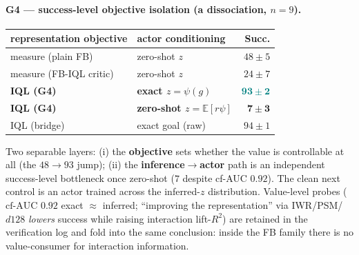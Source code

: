 \documentclass[11pt]{article}
\newcommand{\B}[1]{\textbf{#1}}
\newcommand{\good}[1]{\textcolor{teal}{#1}}
\newcommand{\bad}[1]{\textcolor{red!70!black}{#1}}
\newcommand{\cfauc}{\mbox{cf-AUC}}
\begin{document}
\paragraph{G4 --- success-level objective isolation (a dissociation, $n{=}9$).}
\begin{center}\small
\begin{tabular}{@{}l l r@{}}
\toprule
representation objective & actor conditioning & Succ. \\
\midrule
measure (plain FB)      & zero-shot $z$            & $48\pm5$ \\
measure (FB-IQL critic) & zero-shot $z$            & $24\pm7$ \\
\B{IQL (G4)}            & \B{exact $z{=}\psi(g)$}   & \good{$\mathbf{93\pm2}$} \\
\B{IQL (G4)}            & \B{zero-shot $z{=}\mathbb E[r\psi]$} & \bad{$\mathbf{7\pm3}$} \\
IQL (bridge)            & exact goal (raw)         & $94\pm1$ \\
\bottomrule
\end{tabular}
\end{center}
Two separable layers: (i) the \B{objective} sets whether the value is controllable
at all (the $48{\to}93$ jump); (ii) the \B{inference$\to$actor} path is an
independent success-level bottleneck once zero-shot ($7$ despite \cfauc{} $0.92$).
The clean next control is an actor trained across the inferred-$z$ distribution.
Value-level probes ($\cfauc$ $0.92$ exact $\approx$ inferred; ``improving the
representation'' via IWR/PSM/$d128$ \emph{lowers} success while raising interaction
lift-$R^2$) are retained in the verification log and fold into the same conclusion:
inside the FB family there is no value-consumer for interaction information.
\end{document}

